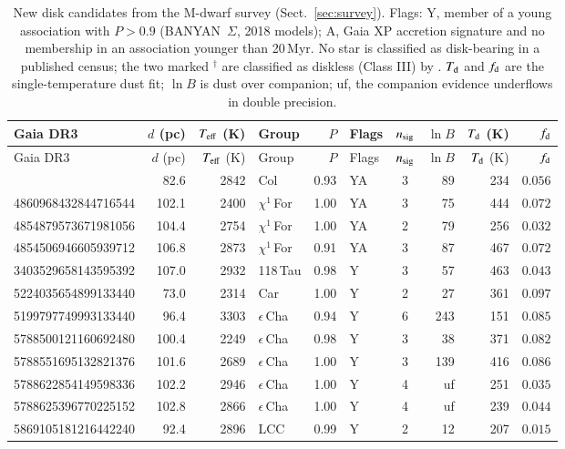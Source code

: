 \begin{longtable}{lrrlrlcrrr}
\caption{New disk candidates from the M-dwarf survey (Sect.~\ref{sec:survey}). Flags: Y, member of a young association with $P > 0.9$ (BANYAN~$\Sigma$, 2018 models); A, Gaia XP accretion signature \citep{delfini2025} and no membership in an association younger than 20\,Myr. No star is classified as disk-bearing in a published census; the two marked $^\dagger$ are classified as diskless (Class III) by \citet{luhman2022b}. $T_{\rm d}$ and $f_{\rm d}$ are the single-temperature dust fit; $\ln B$ is dust over companion; uf, the companion evidence underflows in double precision.}\label{tab:cand}\\
\toprule
Gaia DR3 & $d$ (pc) & $T_{\rm eff}$ (K) & Group & $P$ & Flags & $n_{\rm sig}$ & $\ln B$ & $T_{\rm d}$ (K) & $f_{\rm d}$ \\
\midrule
\endfirsthead
\toprule
Gaia DR3 & $d$ (pc) & $T_{\rm eff}$ (K) & Group & $P$ & Flags & $n_{\rm sig}$ & $\ln B$ & $T_{\rm d}$ (K) & $f_{\rm d}$ \\
\midrule
\endhead
\bottomrule
\endfoot
5568864873853123456 & 82.6 & 2842 & Col & 0.93 & YA & 3 & 89 & 234 & $0.056$ \\
4860968432844716544 & 102.1 & 2400 & $\chi^1$\,For & 1.00 & YA & 3 & 75 & 444 & $0.072$ \\
4854879573671981056 & 104.4 & 2754 & $\chi^1$\,For & 1.00 & YA & 2 & 79 & 256 & $0.032$ \\
4854506946605939712 & 106.8 & 2873 & $\chi^1$\,For & 0.91 & YA & 3 & 87 & 467 & $0.072$ \\
3403529658143595392 & 107.0 & 2932 & 118\,Tau & 0.98 & Y & 3 & 57 & 463 & $0.043$ \\
5224035654899133440 & 73.0 & 2314 & Car & 1.00 & Y & 2 & 27 & 361 & $0.097$ \\
5199797749993133440 & 96.4 & 3303 & $\epsilon$\,Cha & 0.94 & Y & 6 & 243 & 151 & $0.085$ \\
5788500121160692480 & 100.4 & 2249 & $\epsilon$\,Cha & 0.98 & Y & 3 & 38 & 371 & $0.082$ \\
5788551695132821376 & 101.6 & 2689 & $\epsilon$\,Cha & 1.00 & Y & 3 & 139 & 416 & $0.086$ \\
5788622854149598336 & 102.2 & 2946 & $\epsilon$\,Cha & 1.00 & Y & 4 & uf & 251 & $0.035$ \\
5788625396770225152 & 102.8 & 2866 & $\epsilon$\,Cha & 1.00 & Y & 4 & uf & 239 & $0.044$ \\
5869105181216442240 & 92.4 & 2896 & LCC & 0.99 & Y & 2 & 12 & 207 & $0.015$ \\

\end{longtable}
